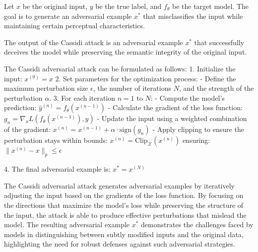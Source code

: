 Let \( x \) be the original input, \( y \) be the true label, and \( f_{\theta} \) be the target model. The goal is to generate an adversarial example \( x^* \) that misclassifies the input while maintaining certain perceptual characteristics.

The output of the Cassidi attack is an adversarial example \( x^* \) that successfully deceives the model while preserving the semantic integrity of the original input.

The Cassidi adversarial attack can be formulated as follows:
1. Initialize the input:
   $x^{(0)} = x$
2. Set parameters for the optimization process:
   - Define the maximum perturbation size \( \epsilon \), the number of iterations \( N \), and the strength of the perturbation \( \alpha \).
3. For each iteration \( n = 1 \) to \( N \):
   - Compute the model's prediction:
   $\hat{y}^{(n)} = f_{\theta}(x^{(n-1)})$
   - Calculate the gradient of the loss function:
   $g_n = \nabla_x L(f_{\theta}(x^{(n-1)}), y)$
   - Update the input using a weighted combination of the gradient:
   $x^{(n)} = x^{(n-1)} + \alpha \cdot \text{sign}(g_n)$
   - Apply clipping to ensure the perturbation stays within bounds:
   $x^{(n)} = \text{Clip}_{\mathcal{X}}(x^{(n)})$
   ensuring:
   $\|x^{(n)} - x\|_p \leq \epsilon$
   
4. The final adversarial example is:
   $x^* = x^{(N)}$

The Cassidi adversarial attack generates adversarial examples by iteratively adjusting the input based on the gradients of the loss function. By focusing on the directions that maximize the model's loss while preserving the structure of the input, the attack is able to produce effective perturbations that mislead the model. The resulting adversarial example \( x^* \) demonstrates the challenges faced by models in distinguishing between subtly modified inputs and the original data, highlighting the need for robust defenses against such adversarial strategies.
